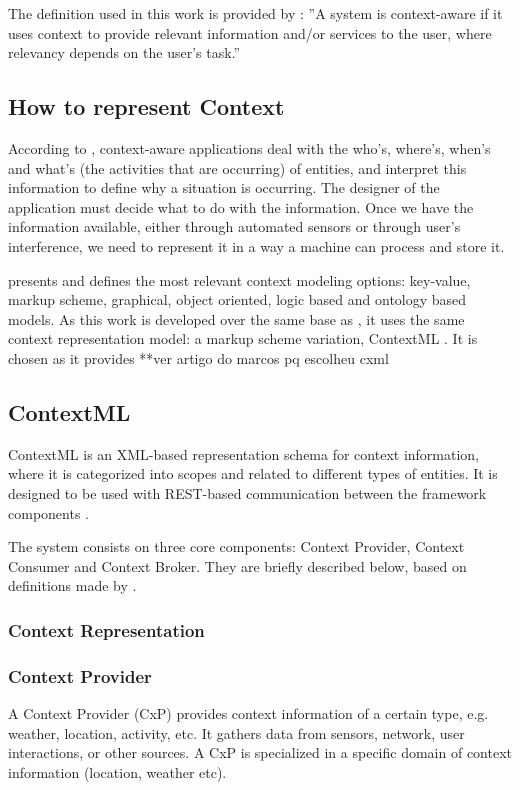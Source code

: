 The definition used in this work is provided by \cite{dey2000providing}: ''A system is context-aware if it uses context to provide relevant information and/or services to the user, where relevancy depends on the user's task.''

\subsection{How to represent Context}
According to \cite{dey2000providing}, context-aware applications deal with the who's, where's, when's and what's (the activities that are occurring) of entities, and interpret this information to define why a situation is occurring. The designer of the application must decide what to do with the information. Once we have the information available, either through automated sensors or through user's interference, we need to represent it in a way a machine can process and store it.

\cite{baldauf2007survey} presents and defines the most relevant context modeling options: key-value, markup scheme, graphical, object oriented, logic based and ontology based models. As this work is developed over the same base as \cite{crippa2010}, it uses the same context representation model: a markup scheme variation, ContextML \cite{knappmeyer2010contextml}. It is chosen as it provides **ver artigo do marcos pq escolheu cxml


\subsection{ContextML}

ContextML is an XML-based representation schema for context information, where it is categorized into scopes and related to different types of entities. It is designed to be used with REST-based communication between the framework components \cite{knappmeyer2010contextml}. 

The system consists on three core components: Context Provider, Context Consumer and Context Broker. They are briefly described below, based on definitions made by \cite{knappmeyer2010contextml}. 



\subsubsection{Context Representation}



\subsubsection{Context Provider}
A Context Provider (CxP) provides context information of a certain type, e.g. weather, location, activity, etc. It gathers data from sensors, network, user interactions, or other sources. A CxP is specialized in a specific domain of context information (location, weather etc).


